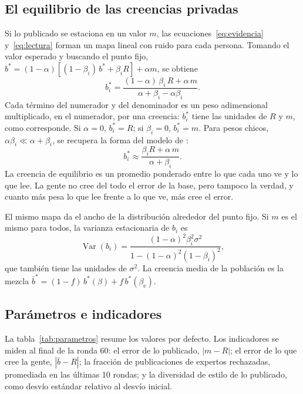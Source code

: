 \documentclass[11pt,a4paper]{article}
\begin{document}
\subsection{El equilibrio de las creencias privadas}\label{sec:equilibrio}

Si lo publicado se estaciona en un valor $m$, las ecuaciones~\eqref{eq:evidencia} y~\eqref{eq:lectura} forman un mapa lineal con ruido para cada persona. Tomando el valor esperado y buscando el punto fijo, $b^* = (1-\alpha)\left[(1-\beta_i)\,b^* + \beta_i R\right] + \alpha m$, se obtiene
\begin{equation}\label{eq:equilibrio}
b_i^* = \frac{(1-\alpha)\,\beta_i\,R + \alpha\,m}{\alpha + \beta_i - \alpha\beta_i}.
\end{equation}
Cada término del numerador y del denominador es un peso adimensional multiplicado, en el numerador, por una creencia: $b_i^*$ tiene las unidades de $R$ y $m$, como corresponde. Si $\alpha = 0$, $b_i^* = R$; si $\beta_i = 0$, $b_i^* = m$. Para pesos chicos, $\alpha\beta_i \ll \alpha + \beta_i$, se recupera la forma del modelo de \textcite{friedkin1990}:
\begin{equation}\label{eq:fj}
b_i^* \approx \frac{\beta_i R + \alpha\, m}{\alpha + \beta_i}.
\end{equation}
La creencia de equilibrio es un promedio ponderado entre lo que cada uno ve y lo que lee. La gente no cree del todo el error de la base, pero tampoco la verdad, y cuanto más pesa lo que lee frente a lo que ve, más cree el error.

El mismo mapa da el ancho de la distribución alrededor del punto fijo. Si $m$ es el mismo para todos, la varianza estacionaria de $b_i$ es
\begin{equation}\label{eq:varianza}
\operatorname{Var}(b_i) = \frac{(1-\alpha)^2 \beta_i^2 \sigma^2}{1 - (1-\alpha)^2 (1-\beta_i)^2},
\end{equation}
que también tiene las unidades de $\sigma^2$. La creencia media de la población es la mezcla $\bar b^* = (1-f)\,b^*(\beta) + f\,b^*(\beta_{\mathrm{e}})$.

\subsection{Parámetros e indicadores}

La tabla~\ref{tab:parametros} resume los valores por defecto. Los indicadores se miden al final de la ronda 60: el error de lo publicado, $|m - R|$; el error de lo que cree la gente, $|\bar b - R|$; la fracción de publicaciones de expertos rechazadas, promediada en las últimas 10 rondas; y la diversidad de estilo de lo publicado, como desvío estándar relativo al desvío inicial.
\end{document}
